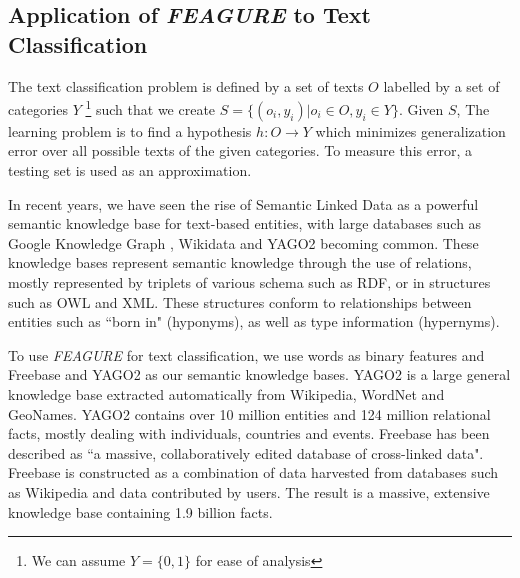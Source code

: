 \documentclass[twoside,11pt]{article}
\theoremstyle{definition}
\begin{document}
\subsection{Application of \emph{FEAGURE} to Text Classification} \label{text-feagure}

The text classification problem is defined by a set of texts $O$ labelled by a set of categories $Y$ \footnote{We can assume $Y=\{0,1\}$ for ease of analysis}
such that we create $S=\{(o_i,y_i)|o_i\in O, y_i\in Y\}$. Given $S$, The learning problem is to find a hypothesis $h:O\rightarrow Y$ which minimizes generalization error over all possible texts of the given categories. To measure this error, a testing set is used as an approximation.

In recent years, we have seen the rise of Semantic Linked Data as a powerful semantic knowledge base for text-based entities, with large databases such as Google Knowledge Graph \cite{pelikanova2014google}, Wikidata \cite{vrandevcic2014wikidata} and YAGO2  becoming common. 
These knowledge bases represent semantic knowledge through the use of relations, mostly represented by triplets of various schema such as RDF, or in structures such as OWL and XML. These structures conform to relationships between entities such as ``born in" (hyponyms), as well as type information (hypernyms).

To use \emph{FEAGURE} for text classification, we use words as binary features and Freebase and YAGO2 as our semantic knowledge bases.
YAGO2 \cite{hoffart2013yago2} is a large general knowledge base extracted automatically from Wikipedia, WordNet and GeoNames.
YAGO2 contains over 10 million entities and 124 million relational facts, mostly dealing with individuals, countries and events.
Freebase \cite{bollacker2008freebase} has been described as ``a massive, collaboratively edited database of cross-linked data". Freebase is constructed as a combination of data harvested from databases such as Wikipedia and data contributed by users. The result is a massive, extensive knowledge base containing 1.9 billion facts. 
\end{document}
